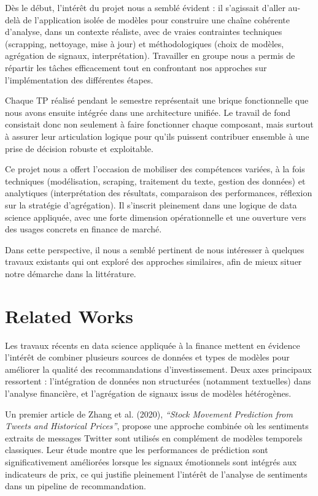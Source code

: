 \documentclass[a4paper,12pt]{article}
\begin{document}
Dès le début, l’intérêt du projet nous a semblé évident : il s’agissait d’aller au-delà de l'application isolée de modèles pour construire une chaîne cohérente d’analyse, dans un contexte réaliste, avec de vraies contraintes techniques (scrapping, nettoyage, mise à jour) et méthodologiques (choix de modèles, agrégation de signaux, interprétation). Travailler en groupe nous a permis de répartir les tâches efficacement tout en confrontant nos approches sur l’implémentation des différentes étapes.

Chaque TP réalisé pendant le semestre représentait une brique fonctionnelle que nous avons ensuite intégrée dans une architecture unifiée. Le travail de fond consistait donc non seulement à faire fonctionner chaque composant, mais surtout à assurer leur articulation logique pour qu’ils puissent contribuer ensemble à une prise de décision robuste et exploitable.

Ce projet nous a offert l’occasion de mobiliser des compétences variées, à la fois techniques (modélisation, scraping, traitement du texte, gestion des données) et analytiques (interprétation des résultats, comparaison des performances, réflexion sur la stratégie d’agrégation). Il s’inscrit pleinement dans une logique de data science appliquée, avec une forte dimension opérationnelle et une ouverture vers des usages concrets en finance de marché.

Dans cette perspective, il nous a semblé pertinent de nous intéresser à quelques travaux existants qui ont exploré des approches similaires, afin de mieux situer notre démarche dans la littérature.

\section{Related Works}

Les travaux récents en data science appliquée à la finance mettent en évidence l’intérêt de combiner plusieurs sources de données et types de modèles pour améliorer la qualité des recommandations d’investissement. Deux axes principaux ressortent : l’intégration de données non structurées (notamment textuelles) dans l’analyse financière, et l’agrégation de signaux issus de modèles hétérogènes.

Un premier article de Zhang et al. (2020), \textit{“Stock Movement Prediction from Tweets and Historical Prices”}, propose une approche combinée où les sentiments extraits de messages Twitter sont utilisés en complément de modèles temporels classiques. Leur étude montre que les performances de prédiction sont significativement améliorées lorsque les signaux émotionnels sont intégrés aux indicateurs de prix, ce qui justifie pleinement l’intérêt de l’analyse de sentiments dans un pipeline de recommandation.
\end{document}
